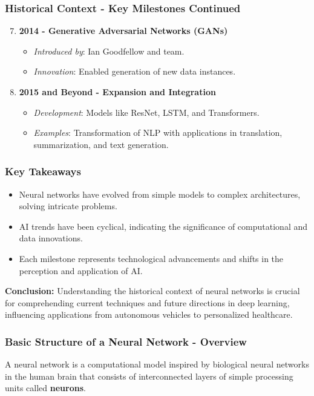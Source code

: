 \documentclass{beamer}
\begin{document}
\begin{frame}[fragile]
    \frametitle{Historical Context - Key Milestones Continued}
    \begin{enumerate}
        \setcounter{enumi}{6}
        
        \item \textbf{2014 - Generative Adversarial Networks (GANs)}
            \begin{itemize}
                \item \textit{Introduced by}: Ian Goodfellow and team.
                \item \textit{Innovation}: Enabled generation of new data instances.
            \end{itemize}
        
        \item \textbf{2015 and Beyond - Expansion and Integration}
            \begin{itemize}
                \item \textit{Development}: Models like ResNet, LSTM, and Transformers.
                \item \textit{Examples}: Transformation of NLP with applications in translation, summarization, and text generation.
            \end{itemize}
    \end{enumerate}
\end{frame}

\begin{frame}[fragile]
    \frametitle{Key Takeaways}
    \begin{itemize}
        \item Neural networks have evolved from simple models to complex architectures, solving intricate problems.
        \item AI trends have been cyclical, indicating the significance of computational and data innovations.
        \item Each milestone represents technological advancements and shifts in the perception and application of AI.
    \end{itemize}

    \textbf{Conclusion:} Understanding the historical context of neural networks is crucial for comprehending current techniques and future directions in deep learning, influencing applications from autonomous vehicles to personalized healthcare.
\end{frame}

\begin{frame}[fragile]
    \frametitle{Basic Structure of a Neural Network - Overview}
    A neural network is a computational model inspired by biological neural networks in the human brain that consists of interconnected layers of simple processing units called \textbf{neurons}.
\end{frame}
\end{document}
